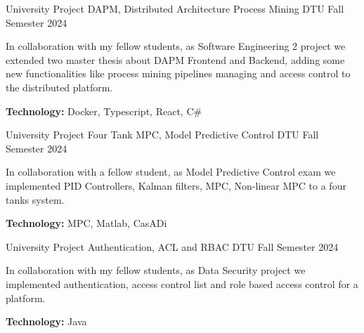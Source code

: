 

\begin{cventries}

  \cventry
    {University Project} %
    {DAPM, Distributed Architecture Process Mining} %
    {DTU} %
    {Fall Semester 2024} %
    {
      \begin{cvitems} %
        \item {In collaboration with my fellow students, as Software Engineering 2 project we extended two master thesis about DAPM Frontend and Backend, adding some new functionalities like process mining pipelines managing and access control to the distributed platform.}
        \item {\textbf{Technology:} Docker, Typescript, React, C\#}
      \end{cvitems}
    }

  \cventry
    {University Project} %
    {Four Tank MPC, Model Predictive Control} %
    {DTU} %
    {Fall Semester 2024} %
    {
      \begin{cvitems} %
        \item {In collaboration with a fellow student, as Model Predictive Control exam we implemented PID Controllers, Kalman filters, MPC, Non-linear MPC to a four tanks system.}
        \item {\textbf{Technology:} MPC, Matlab, CasADi}
      \end{cvitems}
    }

  \cventry
    {University Project} %
    {Authentication, ACL and RBAC} %
    {DTU} %
    {Fall Semester 2024} %
    {
      \begin{cvitems} %
        \item {In collaboration with my fellow students, as Data Security project we implemented authentication, access control list and role based access control for a platform.}
        \item {\textbf{Technology:} Java}
      \end{cvitems}
    }


\end{cventries}
